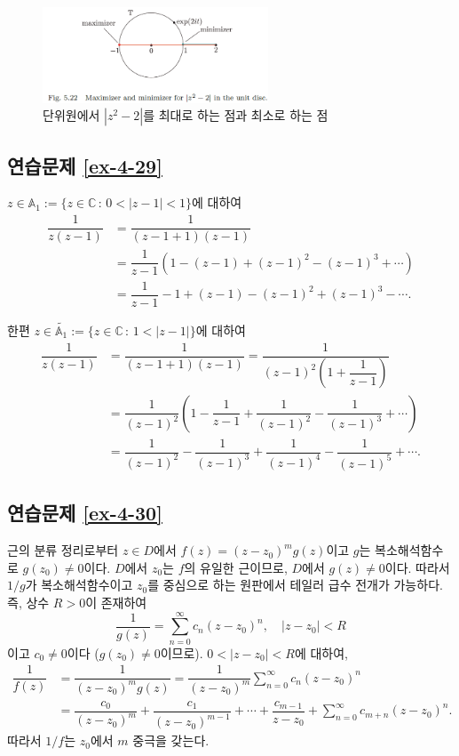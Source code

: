 \begin{figure}[h!]
\begin{center}
\includegraphics[width=0.6\textwidth]{./Solution/figs/fig-5-22}
\end{center}
\caption{단위원에서 $|z^2-2|$를 최대로 하는 점과 최소로 하는 점
}
\label{fig-5-22}
\end{figure}

\subsection*{연습문제 \ref{ex-4-29}}

$z\in \mathbb A_1 := \{ z\in\mathbb C\,:\, 0<|z-1|<1\}$에 대하여
\begin{align*}
\dfrac1{z(z-1)}
&= \dfrac1{(z-1+1)(z-1)} \\
&= \dfrac1{z-1}(1-(z-1) + (z-1)^2 - (z-1)^3 + \cdots) \\
&= \dfrac1{z-1} - 1 + (z-1) - (z-1)^2 + (z-1)^3 - \cdots.
\end{align*}

한편
$z\in \tilde {\mathbb A_1} := \{ z\in\mathbb C\,:\, 1<|z-1|\}$에 대하여
\begin{align*}
\dfrac1{z(z-1)}
&= \dfrac1{(z-1+1)(z-1)}
= \dfrac1{(z-1)^2\left( 1+ \dfrac1{z-1}\right)} \\
&= \dfrac1{(z-1)^2}\left( 1- \dfrac1{z-1} + \dfrac1{(z-1)^2} - \dfrac1{(z-1)^3} + \cdots \right) \\
&= \dfrac1{(z-1)^2} - \dfrac1{(z-1)^3} + \dfrac1{(z-1)^4} - \dfrac1{(z-1)^5} + \cdots.
\end{align*}

\subsection*{연습문제 \ref{ex-4-30}}

근의 분류 정리로부터 $z\in D$에서
$f(z) = (z-z_0)^mg(z)$이고 $g$는 복소해석함수로 $g(z_0)\ne0$이다.
$D$에서 $z_0$는 $f$의 유일한 근이므로, $D$에서 $g(z)\ne0$이다.
따라서 $1/g$가 복소해석함수이고 $z_0$를 중심으로 하는 원판에서 테일러 급수 전개가 가능하다.
즉, 상수 $R>0$이 존재하여
\[
\dfrac1{g(z)} = \sum_{n=0}^\infty c_n(z-z_0)^n,
\quad |z-z_0|<R
\]
이고 $c_0\ne0$이다 ($g(z_0)\ne0$이므로). 
$0<|z-z_0|<R$에 대하여,
\begin{align*}
\dfrac1{f(z)} 
&= \dfrac1{(z-z_0)^m g(z)} = \dfrac1{(z-z_0)^m} \sum_{n=0}^\infty c_n(z-z_0)^n \\
&= \dfrac{c_0}{(z-z_0)^m} +  \dfrac{c_1}{(z-z_0)^{m-1}} + \cdots 
+  \dfrac{c_{m-1}}{z-z_0} + \sum_{n=0}^\infty c_{m+n} (z-z_0)^n.
\end{align*}
따라서 $1/f$는 $z_0$에서 $m$ 중극을 갖는다.

